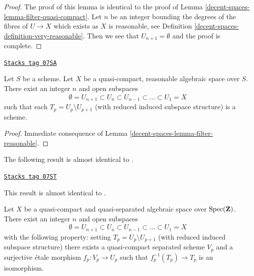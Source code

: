 \begin{proof}
The proof of this lemma is identical to the proof of
Lemma \ref{decent-spaces-lemma-filter-quasi-compact}.
Let $n$ be an integer bounding the degrees of
the fibres of $U \to X$ which exists as $X$ is reasonable, see
Definition \ref{decent-spaces-definition-very-reasonable}.
Then we see that $U_{n + 1} = \emptyset$ and the proof is complete.
\end{proof}

\begin{lemma}
\label{decent-spaces-lemma-stratify-reasonable}
\href{https://stacks.math.columbia.edu/tag/07SA}{\texttt{Stacks tag 07SA}}

Let $S$ be a scheme. Let $X$ be a quasi-compact, reasonable algebraic space
over $S$. There exist an integer $n$ and open subspaces
$$
\emptyset = U_{n + 1} \subset
U_n \subset U_{n - 1} \subset \ldots \subset U_1 = X
$$
such that each $T_p = U_p \setminus U_{p + 1}$ (with reduced induced subspace
structure) is a scheme.
\end{lemma}

\begin{proof}
Immediate consequence of Lemma \ref{decent-spaces-lemma-filter-reasonable}.
\end{proof}

The following result is almost identical to
\cite[Proposition 5.7.8]{GruRay}.

\begin{lemma}
\label{decent-spaces-lemma-filter-quasi-compact-quasi-separated}
\href{https://stacks.math.columbia.edu/tag/07ST}{\texttt{Stacks tag 07ST}}

\begin{reference}
This result is almost identical to \cite[Proposition 5.7.8]{GruRay}.
\end{reference}
Let $X$ be a quasi-compact and quasi-separated algebraic space over
$\operatorname{Spec}(\mathbf{Z})$. There exist an integer $n$ and open subspaces
$$
\emptyset = U_{n + 1} \subset
U_n \subset U_{n - 1} \subset \ldots \subset U_1 = X
$$
with the following property: setting $T_p = U_p \setminus U_{p + 1}$
(with reduced induced subspace structure) there exists a quasi-compact
separated scheme $V_p$ and a surjective \'etale morphism $f_p : V_p \to U_p$
such that $f_p^{-1}(T_p) \to T_p$ is an isomorphism.
\end{lemma}

